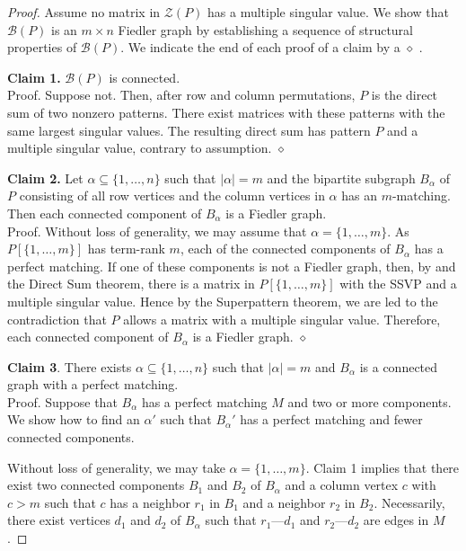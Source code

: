 \documentclass[10pt,a4paper]{amsart}
\begin{document}
\begin{proof}
   Assume no matrix in $\mathcal{Z}(P)$ 
  has a multiple singular value.  We show that $\mathcal{B}(P)$ is an $m\times n$
  Fiedler graph by establishing a sequence of structural properties of 
  $\mathcal{B}(P)$.  We indicate the end of each proof of a claim by a $\diamond$ .

\bigskip\noindent
{\bf Claim 1.} $\mathcal{B}(P)$ is connected. 
\\[12pt]
    Proof. Suppose not.  Then, after row and column permutations, 
    $P$ is  the direct sum of two nonzero patterns.  There exist matrices with these patterns with the same largest singular values. The resulting direct sum has pattern $P$ and a multiple singular value, contrary to assumption. \hfill $\diamond$ 

\bigskip\noindent
{\bf Claim 2.} Let $\alpha \subseteq \{1,\ldots, n\}$ such that 
$|\alpha|=m$ and the bipartite subgraph $B_{\alpha}$ of $P$ consisting of all row vertices 
and the column vertices in $\alpha$ has an $m$-matching.
Then each connected component of  $B_{\alpha}$
is a Fiedler graph.
\\ [12pt]
Proof. Without loss of generality, we may assume that $\alpha=\{1,\ldots, m\}$.
As $P[\{1,\ldots,m\}]$ has term-rank $m$, each of the connected components of $B_{\alpha}$ 
has a perfect matching.  If one of these components is not a Fiedler graph, then, by    and the Direct Sum theorem, there is 
a matrix in $P[\{1,\ldots,m\}]$  with the SSVP and a multiple singular 
value. Hence by the Superpattern theorem, we are led to the contradiction that $P$ allows a matrix with a multiple singular value.
Therefore, each connected component of $B_{\alpha}$ is a Fiedler graph. \hfill $\diamond$ 

\bigskip\noindent
{\bf Claim 3}.
There exists $\alpha \subseteq \{1,\ldots, n\}$ such that 
$|\alpha|=m$ and $B_{\alpha}$ is a connected graph with a perfect matching. 
\\ [12pt]
Proof. Suppose that $B_{\alpha}$ has a perfect matching $M$ and two or more components.
We show how to find an $\alpha'$ such that $B_{\alpha}'$ has a perfect matching 
and fewer connected components. 

Without loss of generality, we may take $\alpha=\{1,\ldots, m\}$.
Claim 1 implies that there exist two connected components $B_1$ and $B_2$ of $B_{\alpha}$
and a column vertex $c$ with $c>m$ such that $c$ has a neighbor $r_1$ in $B_1$
and a neighbor $r_2$ in $B_2$.
Necessarily, there exist vertices $d_1$ and $d_2$ of $B_{\alpha}$
such that {$r_1$---$d_1$} and {$r_2$---$d_2$} are edges in $M$.





\end{proof}
\end{document}
